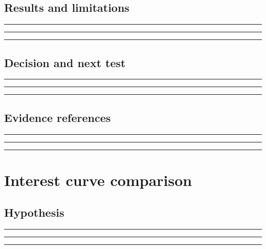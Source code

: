 \documentclass[11pt]{article}
\begin{document}
\subsection{Results and limitations}
\noindent\rule{\linewidth}{0.35pt}\par\vspace{0.22in}
\noindent\rule{\linewidth}{0.35pt}\par\vspace{0.22in}
\noindent\rule{\linewidth}{0.35pt}\par\vspace{0.18in}

\subsection{Decision and next test}
\noindent\rule{\linewidth}{0.35pt}\par\vspace{0.22in}
\noindent\rule{\linewidth}{0.35pt}\par\vspace{0.22in}
\noindent\rule{\linewidth}{0.35pt}\par\vspace{0.18in}

\subsection{Evidence references}
\noindent\rule{\linewidth}{0.35pt}\par\vspace{0.22in}
\noindent\rule{\linewidth}{0.35pt}\par\vspace{0.22in}
\noindent\rule{\linewidth}{0.35pt}\par\vspace{0.18in}
\clearpage

\section{Interest curve comparison}

\subsection{Hypothesis}
\noindent\rule{\linewidth}{0.35pt}\par\vspace{0.22in}
\noindent\rule{\linewidth}{0.35pt}\par\vspace{0.22in}
\noindent\rule{\linewidth}{0.35pt}\par\vspace{0.18in}
\end{document}
